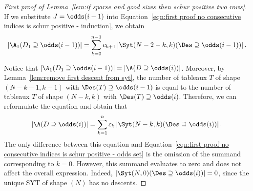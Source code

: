 \begin{proof}[First proof of Lemma~\ref{lem:if sparse and good sizes then schur positive two rows}]
    If we substitute $J = \odds(i-1)$ into Equation~\ref{eqn:first proof no consecutive indices is schur positive - induction}, we obtain
    \[
        \left|\A_1(D_1 \supseteq \odds(i-1))\right| = 
         \sum_{k=0}^{n-1} c_{k+1} \left|\Syt(N-2-k,k)(\Des \supseteq \odds(i-1))\right|.
    \]

    Notice that $\left|\A_1(D_1 \supseteq \odds(i-1))\right| = \left|\A(D \supseteq \odds(i))\right|$. Moreover, by Lemma~\ref{lem:remove first descent from syt}, the number of tableaux $T$ of shape $(N-k-1,k-1)$ with $\Des(T) \supseteq \odds(i-1)$ is equal to the number of tableaux $T$ of shape $(N-k,k)$ with $\Des(T) \supseteq \odds(i)$. Therefore, we can reformulate the equation and obtain that
    \[
        \left|\A(D \supseteq \odds(i))\right| = 
         \sum_{k=1}^{n} c_k \left|\Syt(N-k,k)(\Des \supseteq \odds(i))\right|.
    \]
    The only difference between this equation and Equation~\eqref{eqn:first proof no consecutive indices is schur positive - odds set} is the omission of the summand corresponding to $k=0$. However, this summand evaluates to zero and does not affect the overall expression. Indeed, $\left|\Syt(N,0)(\Des \supseteq \odds(i))\right| = 0$, since the unique SYT of shape $(N)$ has no descents.
\end{proof}


